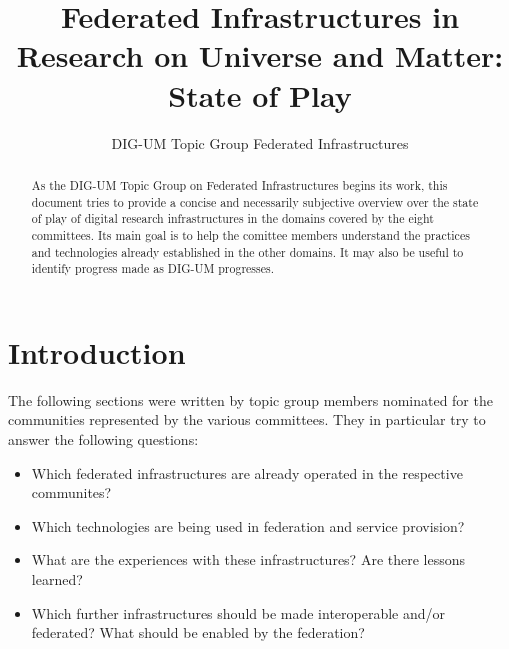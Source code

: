 \documentclass{article}
\title{Federated Infrastructures in Research on Universe and Matter:
State of Play}
\author{DIG-UM Topic Group Federated Infrastructures}
\begin{document}
\maketitle
\begin{abstract}
As the DIG-UM Topic Group on Federated Infrastructures begins its work,
this document tries to provide a concise and necessarily subjective
overview over the state of play of digital research infrastructures in
the domains covered by the eight committees.  Its main goal is to
help the comittee members understand the practices and technologies
already established in the other domains.  It may also be useful to
identify progress made as DIG-UM progresses.

\end{abstract}

\section{Introduction}

The following sections were written by topic group members nominated for
the communities represented by the various committees.  They in
particular try to answer the following questions:

\begin{itemize}
\item Which federated infrastructures are already operated in the
respective communites?
\item Which technologies are being used in federation and service
provision?
\item What are the experiences with these infrastructures?  Are there
lessons learned?
\item Which further infrastructures should be made interoperable and/or
federated?  What should be enabled by the federation?
\end{itemize}


\end{document}
